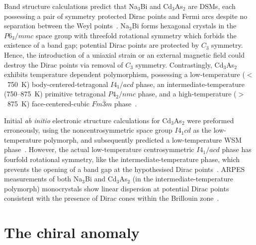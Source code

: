 \documentclass[11pt, a4paper]{article}
\begin{document}
Band structure calculations predict that Na$_{3}$Bi and Cd$_{3}$As$_{2}$ are DSMs, each possessing a
pair of symmetry protected Dirac points and
Fermi arcs despite no separation between the Weyl points~\cite{Na3Bi_abin,Cd3As2_abin}.
Na$_{3}$Bi forms hexagonal crystals in the $P6_{3}/mmc$ space group with threefold rotational
symmetry which forbids the existence of a band gap; potential Dirac points are protected
by $C_{3}$ symmetry. Hence, the introduction of a uniaxial strain or an external magnetic field
could destroy the Dirac points via removal of $C_3$ symmetry.
Contrastingly, Cd$_{3}$As$_{2}$ exhibits temperature 
dependent polymorphism, possessing a low-temperature ($<$~\qty{750}{\kelvin})
body-centered-tetragonal $I4_{1}/acd$ phase,
an intermediate-temperature (750--\qty{875}{\kelvin}) primitive tetragonal $P4_{2}/nmc$ phase,
and a high-temperature ($>$~\qty{875}{\kelvin}) face-centered-cubic
$Fm\bar{3}m$ phase~\cite{Cd3As2_structure,Cd3As2_polymorphism}.

Initial \textit{ab initio} electronic structure calculations for Cd$_3$As$_{2}$
were preformed erroneously, using the noncentrosymmetric space group $I4_1cd$ as the low-temperature
polymorph, and subsequently predicted a low-temperature WSM phase~\cite{Cd3As2_abin}.
However, the actual low-temperature centrosymmetric $I4_{1}/acd$ phase has fourfold rotational
symmetry, like the intermediate-temperature phase,
which prevents the opening of a band gap at the hypothesised
Dirac points~\cite{Cd3As2_structure2, Cd3As2_structure}.
ARPES measurements of both Na$_{3}$Bi and Cd$_{3}$As$_{2}$ (in the intermediate-temperature
polymorph) monocrystals show linear dispersion at
potential Dirac points consistent with the presence of Dirac cones within the Brillouin 
zone~\cite{Na3Bi_ARPES,Cd3As2_ARPES}.

\section{The chiral anomaly}
\end{document}
